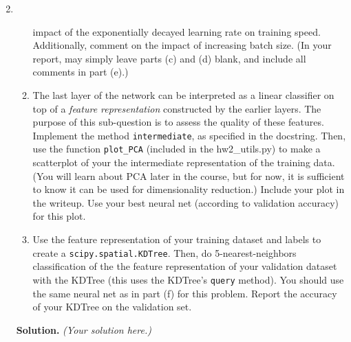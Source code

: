 \documentclass{article}
\theoremstyle{definition}
\theoremstyle{remark}
\newenvironment{Q}
        {%
            \clearpage
        \item
            }
        {%
            \phantom{s}
          \bigskip
          \textbf{Solution.}
        }
\begin{document}
\begin{enumerate}
\begin{Q}
\begin{enumerate}
                            impact of the exponentially decayed learning rate
                            on training speed.  Additionally, comment on the
                            impact of increasing batch size. (In your report, may simply leave parts (c) and (d) blank, and include all comments in part (e).)
                        \item
                            The last layer of the network can be interpreted as a
                            linear classifier on top of a \emph{feature
                            representation} constructed by the earlier layers.
                            The purpose of this sub-question is to assess the
                            quality of these features.  Implement the method
                            \texttt{intermediate}, as specified in the
                            docstring.  Then, use the function
                            \texttt{plot\_PCA} (included in the hw2\_utils.py)
                            to make a scatterplot of your the intermediate
                            representation of the training data.  (You will
                            learn about PCA later in the course, but for now,
                            it is sufficient to know it can be used for
                            dimensionality reduction.)  Include your plot in
                            the writeup.  Use your best neural net (according
                            to validation accuracy) for this plot.
                        \item Use the feature representation of your training
                            dataset and labels to create a
                            \texttt{scipy.spatial.KDTree}.  Then, do
                            5-nearest-neighbors classification of the the
                            feature representation of your validation dataset
                            with the KDTree (this uses the KDTree's
                            \texttt{query} method).  You should use the same
                            neural net as in part (f) for this problem.  Report
                            the accuracy of your KDTree on the validation set.
                    \end{enumerate}
                \end{Q}
                \emph{(Your solution here.)}
            \end{enumerate}


        
\end{document}
